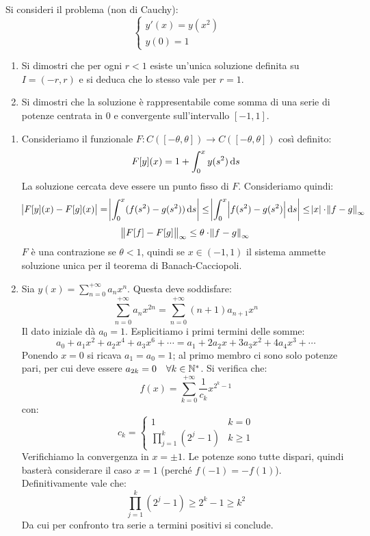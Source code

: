 \begin{vares}
  Si consideri il problema (non di Cauchy):
  \[
    \begin{cases}
      y'(x) = y(x^2) \\
      y(0) = 1
    \end{cases}
  \]
  \begin{enumerate}[label = (\roman*)]
  \item Si dimostri che per ogni $ r < 1 $ esiste un'unica soluzione definita su $ I = (-r, r) $ e si deduca che lo stesso vale per $ r = 1 $.
  \item Si dimostri che la soluzione è rappresentabile come somma di una serie di potenze centrata in 0 e convergente sull'intervallo $ [-1, 1] $.
  \end{enumerate}
\end{vares}
%
\begin{enumerate}[label = (\roman*)]
\item Consideriamo il funzionale $ F \colon C \left( [-\theta, \theta] \right) \rightarrow C \left( [-\theta, \theta] \right) $ così definito:
  \[ F[y](x) = 1 + \int_{0}^{x} y(s^2) \dif s \]
  La soluzione cercata deve essere un punto fisso di $ F $. Consideriamo quindi:
  \[ \abs{ F[y](x) - F[g](x) } = \abs{ \int_{0}^{x} ( f(s^2) - g(s^2) ) \dif s } \leq \abs{ \int_{0}^{x} \abs{ f(s^2) - g(s^2) } \dif s } \leq \abs{x} \cdot \norm{f-g}_{\infty} \]
  \[ \norm{F[f] - F[g]}_{\infty} \leq \theta \cdot \norm{f-g}_{\infty} \]
  $ F $ è una contrazione se $ \theta < 1 $, quindi se $ x \in (-1,1) $ il sistema ammette soluzione unica per il teorema di Banach-Cacciopoli.
\item Sia $ y(x) = \sum_{n=0}^{+\infty} a_n x^n $. Questa deve soddisfare:
  \[ \sum_{n=0}^{+\infty} a_n x^{2n} = \sum_{n=0}^{+\infty} (n+1) a_{n+1} x^n \]
  Il dato iniziale dà $ a_0 = 1 $. Esplicitiamo i primi termini delle somme:
  \[ a_0 + a_1 x^2 + a_2 x^4 + a_3 x^6 + \cdots = a_1 + 2a_2 x + 3a_3 x^2 + 4a_4 x^3 + \cdots \]
  Ponendo $ x = 0 $ si ricava $ a_1 = a_0 = 1 $; al primo membro ci sono solo potenze pari, per cui deve essere $ a_{2k} = 0 \quad \forall k \in \mathbb{N}^*$. Si verifica che:
  \[ f(x) = \sum_{k=0}^{+\infty} \frac{1}{c_{k}} x^{2^k-1} \]
  con:
  \[ c_k = \begin{cases}
      1 & k=0\\
      \prod_{j=1}^{k} (2^j - 1) & k \ge 1
    \end{cases} \]
  Verifichiamo la convergenza in $ x = \pm 1 $. Le potenze sono tutte dispari, quindi basterà considerare il caso $ x = 1 $ (perché $ f(-1) = -f(1) $). Definitivamente vale che:
  \[ \prod_{j=1}^k (2^j - 1) \ge 2^k-1 \ge k^2 \]
  Da cui per confronto tra serie a termini positivi si conclude.

\end{enumerate}


